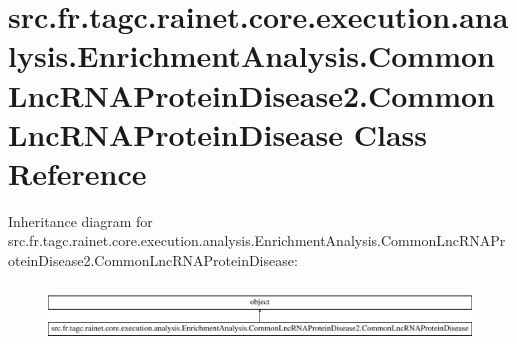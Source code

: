 \hypertarget{classsrc_1_1fr_1_1tagc_1_1rainet_1_1core_1_1execution_1_1analysis_1_1EnrichmentAnalysis_1_1Commo70ca5c91857cc3a649e8e2158b3a9c9f}{\section{src.\-fr.\-tagc.\-rainet.\-core.\-execution.\-analysis.\-Enrichment\-Analysis.\-Common\-Lnc\-R\-N\-A\-Protein\-Disease2.\-Common\-Lnc\-R\-N\-A\-Protein\-Disease Class Reference}
\label{classsrc_1_1fr_1_1tagc_1_1rainet_1_1core_1_1execution_1_1analysis_1_1EnrichmentAnalysis_1_1Commo70ca5c91857cc3a649e8e2158b3a9c9f}
}
Inheritance diagram for src.\-fr.\-tagc.\-rainet.\-core.\-execution.\-analysis.\-Enrichment\-Analysis.\-Common\-Lnc\-R\-N\-A\-Protein\-Disease2.\-Common\-Lnc\-R\-N\-A\-Protein\-Disease\-:\begin{figure}[H]
\begin{center}
\leavevmode
\includegraphics[height=1.507402cm]{classsrc_1_1fr_1_1tagc_1_1rainet_1_1core_1_1execution_1_1analysis_1_1EnrichmentAnalysis_1_1Commo70ca5c91857cc3a649e8e2158b3a9c9f}
\end{center}
\end{figure}

